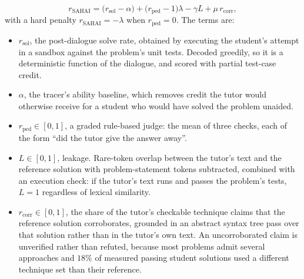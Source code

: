 %
\begin{equation}
r_{\mathrm{SAHAI}}=\bigl(r_{\mathrm{sol}}-\alpha\bigr)
+\bigl(r_{\mathrm{ped}}-1\bigr)\lambda-\gamma L
+\mu\, r_{\mathrm{corr}},
\label{eq:reward}
\end{equation}
with a hard penalty $r_{\mathrm{SAHAI}}=-\lambda$ when
$r_{\mathrm{ped}}=0$. The terms are:
\begin{itemize}[leftmargin=*,topsep=2pt,itemsep=1pt,parsep=0pt]
\item $r_{\mathrm{sol}}$, the post-dialogue solve rate, obtained by executing
      the student's attempt in a sandbox against the problem's unit tests.
      Decoded greedily, so it is a deterministic function of the dialogue, and
      scored with partial test-case credit.
\item $\alpha$, the tracer's ability baseline, which removes credit the tutor
      would otherwise receive for a student who would have solved the problem
      unaided.
\item $r_{\mathrm{ped}}\in[0,1]$, a graded rule-based judge: the mean of three
      checks, each of the form ``did the tutor give the answer away''.
\item $L\in[0,1]$, leakage. Rare-token overlap between the tutor's text and the
      reference solution with problem-statement tokens subtracted, combined with
      an execution check: if the tutor's text runs and passes the problem's
      tests, $L{=}1$ regardless of lexical similarity.
\item $r_{\mathrm{corr}}\in[0,1]$, the share of the tutor's checkable technique
      claims that the reference solution corroborates, grounded in an abstract
      syntax tree pass over that solution rather than in the tutor's own text.
      An uncorroborated claim is unverified rather than refuted, because most
      problems admit several approaches and $18\%$ of measured passing student
      solutions used a different technique set than their reference.
\end{itemize}

